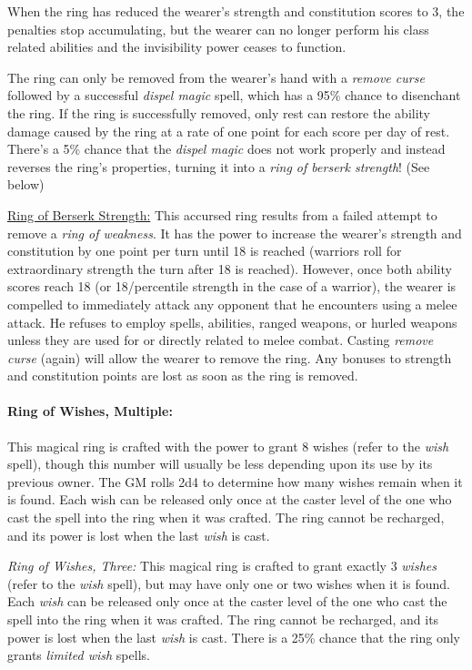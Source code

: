 \begin{multicols}{2}
When the ring has reduced the wearer's strength and constitution scores to 3, the penalties stop accumulating, but the wearer can no longer perform his class related abilities and the invisibility power ceases to function.

The ring can only be removed from the wearer's hand with a \textit{remove curse} followed by a successful \textit{dispel magic} spell, which has a 95\% chance to disenchant the ring.  If the ring is successfully removed, only rest can restore the ability damage caused by the ring at a rate of one point for each score per day of rest.  There's a 5\% chance that the \textit{dispel magic} does not work properly and instead reverses the ring's properties, turning it into a \textit{ring of berserk strength}! (See below)  

\underline{Ring of Berserk Strength:} This accursed ring results from a failed attempt to remove a \textit{ring of weakness}.  It has the power to increase the wearer's strength and constitution by one point per turn until 18 is reached (warriors roll for extraordinary strength the turn after 18 is reached).  However, once both ability scores reach 18 (or 18/percentile strength in the case of a warrior), the wearer is compelled to immediately attack any opponent that he encounters using a melee attack.  He refuses to employ spells, abilities, ranged weapons, or hurled weapons unless they are used for or directly related to melee combat.  Casting \textit{remove curse} (again) will allow the wearer to remove the ring.  Any bonuses to strength and constitution points are lost as soon as the ring is removed.

\paragraph{Ring of Wishes, Multiple:} This magical ring is crafted with the power to grant 8 wishes (refer to the \textit{wish} spell), though this number will usually be less depending upon its use by its previous owner.  The GM rolls 2d4 to determine how many wishes remain when it is found.  Each wish can be released only once at the caster level of the one who cast the spell into the ring when it was crafted.  The ring cannot be recharged, and its power is lost when the last \textit{wish} is cast.

\textit{Ring of Wishes, Three:} This magical ring is crafted to grant exactly 3 \textit{wishes} (refer to the \textit{wish} spell), but may have only one or two wishes when it is found.  Each \textit{wish} can be released only once at the caster level of the one who cast the spell into the ring when it was crafted.  The ring cannot be recharged, and its power is lost when the last \textit{wish} is cast.  There is a 25\% chance that the ring only grants \textit{limited wish} spells.


\end{multicols}
